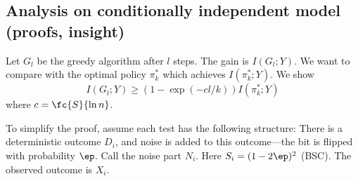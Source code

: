
\subsection{Analysis on conditionally independent model (proofs, insight)}

Let $G_l$ be the greedy algorithm after $l$ steps. The gain is $I(G_l;Y)$. We want to compare with the optimal policy $\pi_k^*$ which achieves $I(\pi_k^*;Y)$. We show
$$
I(G_l;Y) \ge (1-\exp(-cl/k))I(\pi_k^*;Y)
$$
where $c=\fc{S}{\ln n}$. 

To simplify the proof, assume each test has the following structure: There is a deterministic outcome $D_i$, and noise is added to this outcome---the bit is flipped with probability $\ep$. Call the noise part $N_i$. Here $S_i = (1-2\ep)^2$ (BSC). The observed outcome is $X_i$.

